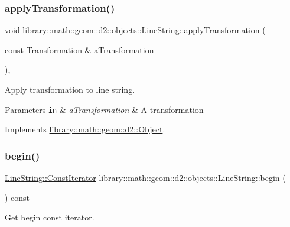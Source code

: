 \subsubsection{\texorpdfstring{apply\+Transformation()}{applyTransformation()}}
{\footnotesize\ttfamily void library\+::math\+::geom\+::d2\+::objects\+::\+Line\+String\+::apply\+Transformation (\begin{DoxyParamCaption}\item[{const \hyperlink{classlibrary_1_1math_1_1geom_1_1d2_1_1_transformation}{Transformation} \&}]{a\+Transformation }\end{DoxyParamCaption})\hspace{0.3cm}{\ttfamily [override]}, {\ttfamily [virtual]}}



Apply transformation to line string. 


\begin{DoxyParams}[1]{Parameters}
\mbox{\tt in}  & {\em a\+Transformation} & A transformation \\
\hline
\end{DoxyParams}


Implements \hyperlink{classlibrary_1_1math_1_1geom_1_1d2_1_1_object_a289589fb6e9e7a2c4ca4976a1544def5}{library\+::math\+::geom\+::d2\+::\+Object}.

\mbox{\label{classlibrary_1_1math_1_1geom_1_1d2_1_1objects_1_1_line_string_af2e6ff6ec6714eb64bda3c270c92469d}} 
\subsubsection{\texorpdfstring{begin()}{begin()}}
{\footnotesize\ttfamily \hyperlink{classlibrary_1_1math_1_1geom_1_1d2_1_1objects_1_1_line_string_a7c7a81b557da8ed855b5f4b88a5fa837}{Line\+String\+::\+Const\+Iterator} library\+::math\+::geom\+::d2\+::objects\+::\+Line\+String\+::begin (\begin{DoxyParamCaption}{ }\end{DoxyParamCaption}) const}



Get begin const iterator. 

